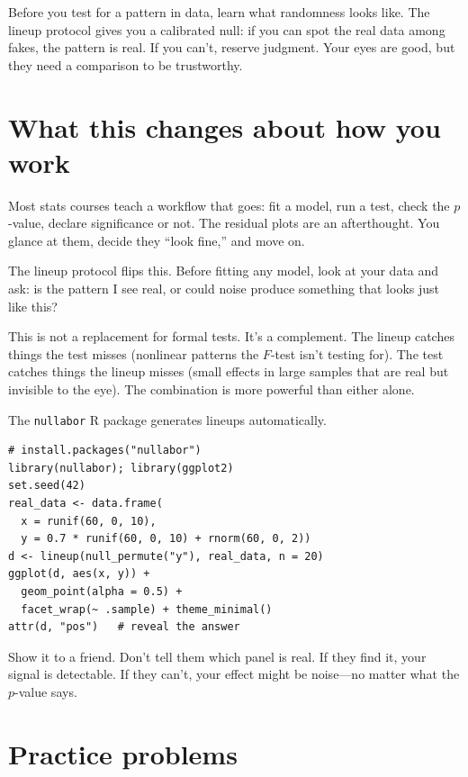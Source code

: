 \begin{keyinsight}
Before you test for a pattern in data, learn what randomness looks like. The lineup protocol gives you a calibrated null: if you can spot the real data among fakes, the pattern is real. If you can't, reserve judgment. Your eyes are good, but they need a comparison to be trustworthy.
\end{keyinsight}

\section{What this changes about how you work}

Most stats courses teach a workflow that goes: fit a model, run a test, check the $p$-value, declare significance or not. The residual plots are an afterthought. You glance at them, decide they ``look fine,'' and move on.

The lineup protocol flips this. Before fitting any model, look at your data and ask: is the pattern I see real, or could noise produce something that looks just like this?

This is not a replacement for formal tests. It's a complement. The lineup catches things the test misses (nonlinear patterns the $F$-test isn't testing for). The test catches things the lineup misses (small effects in large samples that are real but invisible to the eye). The combination is more powerful than either alone.

\begin{codelab}
The \texttt{nullabor} R package generates lineups automatically.
\begin{lstlisting}[language=Rlang]
# install.packages("nullabor")
library(nullabor); library(ggplot2)
set.seed(42)
real_data <- data.frame(
  x = runif(60, 0, 10),
  y = 0.7 * runif(60, 0, 10) + rnorm(60, 0, 2))
d <- lineup(null_permute("y"), real_data, n = 20)
ggplot(d, aes(x, y)) +
  geom_point(alpha = 0.5) +
  facet_wrap(~ .sample) + theme_minimal()
attr(d, "pos")   # reveal the answer
\end{lstlisting}
Show it to a friend. Don't tell them which panel is real. If they find it, your signal is detectable. If they can't, your effect might be noise---no matter what the $p$-value says.
\end{codelab}

\section{Practice problems}

